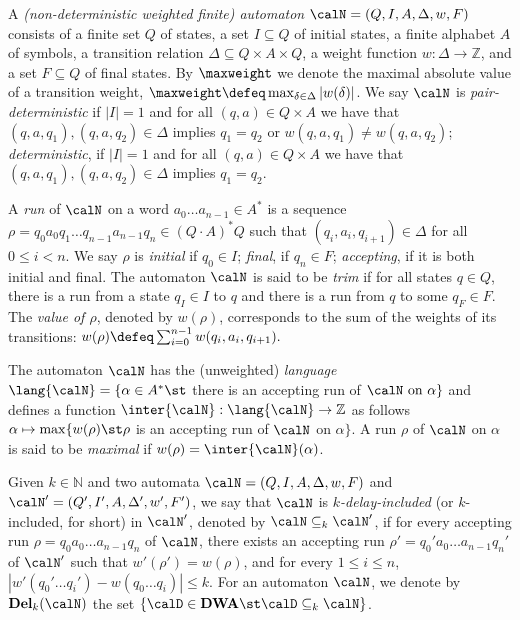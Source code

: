 \documentclass[a4paper]{article}
\begin{document}
A \emph{(non-deterministic weighted finite) automaton} $\calN = (Q, I, A,
\Delta,w, F)$ consists of a finite set $Q$ of
states, a set $I \subseteq Q$ of initial states,
a finite alphabet $A$ of symbols, 
a transition relation $\Delta
\subseteq Q \times A \times Q$, a weight function $w : \Delta \rightarrow
\mathbb{Z}$, and a set $F \subseteq Q$ of final states. By $\maxweight$ we
denote the maximal absolute value of a transition weight, \ie $\maxweight \defeq
\max_{\delta \in \Delta} |w(\delta)|$.
We say $\calN$ is \emph{pair-deterministic} if $|I| = 1$ and for all
$(q,a) \in Q \times A$ we have that $(q,a,q_1), (q,a,q_2) \in \Delta$ implies
$q_1 = q_2$ or $w(q,a,q_1) \neq w(q,a,q_2)$;
\emph{deterministic}, if $|I| = 1$ and
for all $(q,a) \in Q \times A$ we have that $(q,a,q_1), (q,a,q_2) \in \Delta$
implies $q_1 = q_2$.

A \emph{run} of $\calN$ on a word $a_0 \dots a_{n-1} \in A^*$ is a sequence
$\rho = q_0 a_0 q_1 \dots q_{n-1} a_{n-1} q_n \in (Q \cdot A)^*Q$ such that
$(q_i,a_i,q_{i+1}) \in \Delta$ for all $0 \le i < n$.
We say $\rho$ is \emph{initial} if $q_0 \in I$; \emph{final}, if $q_n \in F$;
\emph{accepting}, if it is both initial and final.
The automaton $\calN$ is said to be \emph{trim} if for all states $q \in Q$,
there is a run from a state $q_I \in I$ to $q$ and there is a run from $q$ to
some $q_F \in F$.
The \emph{value of
$\rho$}, denoted by $w(\rho)$, corresponds to the sum of the weights of its
transitions:
\(
	w(\rho) \defeq \sum_{i = 0}^{n-1} w(q_i,a_i,q_{i+1}).
\)

The automaton $\calN$ has the (unweighted) \emph{language}
$\lang{\calN} = \{ \alpha \in A^* \st$ there is an accepting run of
$\calN \text{ on } \alpha \}$ and defines a function $\inter{\calN}
: \lang{\calN} \to \mathbb{Z}$ as follows $\alpha \mapsto \max\{
w(\rho) \st \rho$ is an accepting run of $\calN$ on $\alpha\}$. A run $\rho$ of
$\calN$ on $\alpha$ is said to be \emph{maximal} if $w(\rho) =
\inter{\calN}(\alpha)$.

Given $k \in \mathbb{N}$ and two automata $\calN = (Q,I, A,
\Delta, w,F)$ and $\calN' =  (Q', I', A, \Delta', w',F')$, we say that
$\calN$ is \emph{$k$-delay-included} (or $k$-included, for short) in
$\calN'$, denoted by $\calN \subseteq_k \calN'$, if for every accepting run
$\rho = q_0 a_0 \dots a_{n-1} q_n$ of $\calN$, there exists an accepting
run $\rho' = q_0' a_0 \dots a_{n-1} q_n'$ of $\calN'$ such that $w'(\rho') =
w(\rho)$, and for every $1 \leq i \leq n$, $|w'(q_0' \dots q_i') - w(q_0 \dots
q_i)| \leq k$. For an automaton $\calN$, we denote by $\mathbf{Del}_k(\calN)$
the set $\{\calD \in \mathbf{DWA} \st 
\calD \subseteq_k \calN\}$.
\end{document}
